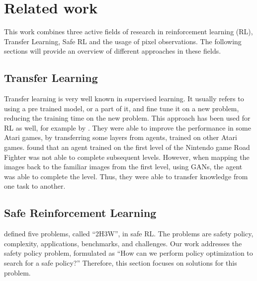 \chapter{Related work}
\label{ch:relatedWork}

This work combines  three active fields of research in reinforcement learning (RL), Transfer Learning, Safe RL and the usage of pixel observations. The following sections will provide an overview of different approaches in these fields.

\section{Transfer Learning}
\label{sec:transferLearning}

Transfer learning is very well known in supervised learning. It usually refers to using a pre trained model, or a part of it, and fine tune it on a new problem, reducing the training time on the new problem. This approach has been used for RL as well, for example by \citeauthor{delacruzInitialProgressTransfer2016} \cite{delacruzInitialProgressTransfer2016}. They were able to improve the performance in some Atari games, by transferring some layers from agents, trained on other Atari games. \citeauthor{gamrianTransferLearningRelated2019a} \cite{gamrianTransferLearningRelated2019a} found that an agent trained on the first level of the Nintendo game Road Fighter was not able to complete subsequent levels. However, when mapping the images back to the familiar images from the first level, using GANs, the agent was able to complete the level. Thus, they were able to transfer knowledge from one task to another.

\section{Safe Reinforcement Learning}
\label{sec:safeRL}

\citeauthor{guReviewSafeReinforcement2022} \cite{guReviewSafeReinforcement2022} defined five problems, called \enquote{2H3W}, in safe RL. The problems are safety policy, complexity, applications, benchmarks, and challenges. Our work addresses the safety policy problem, formulated as \enquote{How can we perform policy optimization to search for a safe policy?}\cite{guReviewSafeReinforcement2022} Therefore, this section focuses on solutions for this problem.

